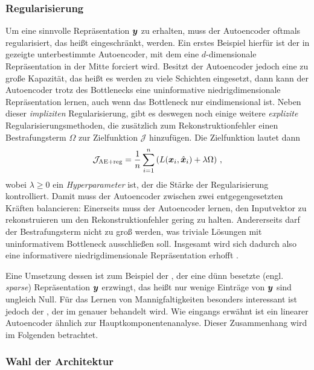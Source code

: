 \subsubsection{Regularisierung}
\label{ch:MethodenDerDimRed:ML:AE:Regularisierung}
Um eine sinnvolle Repräsentation $\bm{y}$ zu erhalten, muss der Autoencoder oftmals
regularisiert, das heißt eingeschränkt, werden. Ein erstes Beispiel hierfür ist der in
 gezeigte unterbestimmte Autoencoder, mit dem eine $d$-dimensionale
Repräsentation in der Mitte forciert wird. Besitzt der Autoencoder jedoch eine zu große Kapazität,
das heißt es werden zu viele Schichten eingesetzt, dann kann der Autoencoder trotz des Bottlenecks
eine uninformative niedrigdimensionale Repräsentation lernen, auch wenn das Bottleneck nur
eindimensional ist. Neben dieser \textit{impliziten} Regularisierung, gibt es deswegen noch einige
weitere \textit{explizite} Regularisierungsmethoden, die zusätzlich zum Rekonstruktionfehler einen
Bestrafungsterm $\Omega$ zur Zielfunktion $\mathcal{J}$ hinzufügen. Die Zielfunktion lautet dann
\begin{equation}
	\mathcal{J}_{\text{AE+reg}} = \frac{1}{n} \sum_{i = 1}^{n} \left( L(\bm{x}_i, \hat{\bm{x}}_i) + \lambda \Omega \right) \, ,
\end{equation}
wobei $\lambda \geq 0$ ein \textit{Hyperparameter} ist, der die Stärke der Regularisierung kontrolliert. Damit muss der Autoencoder zwischen zwei entgegengesetzten Kräften balancieren: Einerseits muss der Autoencoder lernen, den Inputvektor zu rekonstruieren um den Rekonstruktionfehler gering zu halten. Andererseits darf der Bestrafungsterm nicht zu groß werden, was triviale Lösungen mit uninformativem Bottleneck ausschließen soll. Insgesamt wird sich dadurch also eine informativere niedrigdimensionale Repräsentation erhofft \parencite[516]{Goodfellow.2016}.

Eine Umsetzung dessen ist zum Beispiel der , der eine dünn besetzte
(engl. \textit{sparse}) Repräsentation $\bm{y}$ erzwingt, das heißt nur wenige Einträge von
$\bm{y}$ sind ungleich Null. Für das Lernen von Mannigfaltigkeiten besonders interessant ist
jedoch der  \parencite{Rifai.2011}, der im  genauer behandelt wird. Wie
eingangs erwähnt ist ein linearer Autoencoder ähnlich zur Hauptkomponentenanalyse. Dieser
Zusammenhang wird im Folgenden betrachtet.

\subsubsection{Wahl der Architektur}
\label{ch:MethodenDerDimRed:ML:AE:WahlArchitektur}

